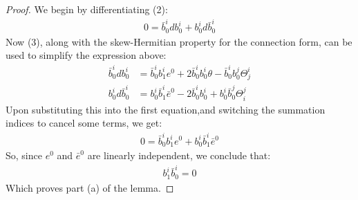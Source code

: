 \documentclass[11pt]{amsart}
\theoremstyle{definition}
\theoremstyle{definition}
\begin{document}
\begin{proof} We begin by differentiating (2):
%
\begin{align*}
0 = \bar{b}^i_0 d b^i_0 + b^i_0 d \bar{b}^i_0
\end{align*}
%
Now (3), along with the skew-Hermitian property for the connection form, can be used to simplify the expression above:
%
\begin{align*}
\bar{b}^i_0 d b^i_0 &= \bar{b}^i_0 b^i_1 e^0 + 2 \bar{b}^i_0 b^i_0 \theta - \bar{b}^i_0 b^j_0 \Theta^i_j \\
b^i_0 d \bar{b}^i_0 &= b^i_0 \bar{b}^i_1 \bar{e}^0 - 2 \bar{b}^i_0 b^i_0 + b^i_0 \bar{b}^j_0 \Theta^j_i
\end{align*}
%
Upon substituting this into the first equation,and switching the summation indices to cancel some terms, we get:
%
\begin{align*}
0 = \bar{b}^i_0 b^i_1 e^0 + b^i_0 \bar{b}^i_1 \bar{e}^0
\end{align*}
%
So, since $e^0$ and $\bar{e}^0$ are linearly independent, we conclude that:
%
\begin{align}
b^i_1 \bar{b}^i_0 = 0
\end{align}
%
Which proves part (a) of the lemma.


\end{proof}
\end{document}

